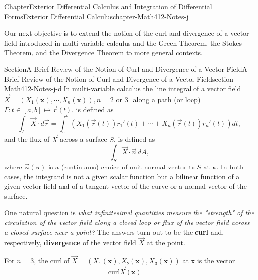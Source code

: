 \documentclass[oneside,10pt,]{book}
\newcommand{\terminology}[1]{\textbf{#1}}
\numberwithin{equation}{section}
\newcommand{\bx}{\mathbf{x}}
\begin{document}
\begin{chapterptx}{Chapter}{Exterior Differential Calculus and Integration of Differential Forms}{}{Exterior Differential Calculus}{}{}{chapter-Math412-Notes-j}
\renewcommand*{\chaptername}{Chapter}
\begin{introduction}{}%
Our next objective is to extend the notion of the curl and divergence of a vector field introduced in multi-variable calculus and the Green Theorem, the Stokes Theorem, and the Divergence Theorem to more general contexts.\end{introduction}%
%
%
\typeout{************************************************}
\typeout{************************************************}
%
\begin{sectionptx}{Section}{A Brief Review of the Notion of Curl and Divergence of a Vector Field}{}{A Brief Review of the Notion of Curl and Divergence of a Vector Field}{}{}{section-Math412-Notes-j-d}
In multi-variable calculus the line integral of a vector field \(\vec{X}=(X_{1}(\bx),\cdots, X_{n}(\bx)), n=2 \text{ or } 3,\) along a path (or loop) \(\Gamma: t\in [a, b]\mapsto \vec{r}(t)\),  is defined as%
\begin{equation*}
\int_{\Gamma} \vec{X}\cdot d\vec{r} = \int_{a}^{b} 
\left( X_1(\vec{r}(t))r_1'(t)+ \cdots + X_n(\vec{r}(t))r_n'(t)\right)dt,
\end{equation*}
and the flux of \(\vec{X}\) across a surface \(S\), is defined as%
\begin{equation*}
\int_S \vec{X} \cdot \vec{n}\, dA,
\end{equation*}
where \(\vec{n}(\bx)\) is a (continuous) choice of unit normal vector to \(S\) at \(\bx\). In both cases, the integrand is not a given scalar function but a bilinear function of a given vector field and of a tangent vector of the curve or a normal vector of the surface.%
\par
One natural question is \emph{what infinitesimal quantities measure the "strength" of  the circulation of the vector field along a closed loop or flux of the vector field across a closed surface near a point?} The answers turn out to be the \terminology{curl} and, respectively, \terminology{divergence} of the vector field \(\vec{X}\) at the point.%
\par
For \(n=3\), the curl of \(\vec{X}=(X_{1}(\bx),X_{2}(\bx), X_{3}(\bx))\) at \(\bx\) is the vector%
\begin{equation*}
\text{curl} \vec{X}(\bx)=

\end{equation*}
\end{sectionptx}
\end{chapterptx}
\end{document}
